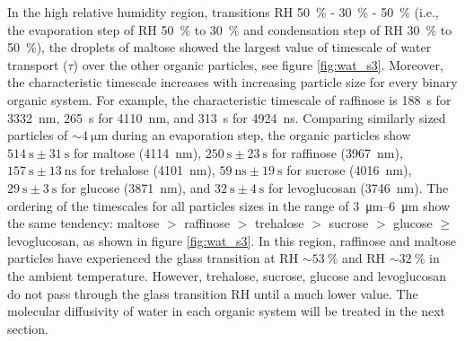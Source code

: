 In the high relative humidity region, transitions RH \SI{50}{\percent} - \SI{30}{\percent} - \SI{50}{\percent} (i.e., the evaporation step of RH \SI{50}{\percent} to \SI{30}{\percent} and condensation step of RH \SI{30}{\percent} to \SI{50}{\percent}), the droplets of maltose showed the largest value of timescale of water transport ($\tau$) over the other organic particles, see figure \ref{fig:wat_s3}. Moreover, the characteristic timescale increases with increasing particle size for every binary organic system. For example, the characteristic timescale of raffinose is \SI{188}{\second} for \SI{3332}{\nano\meter}, \SI{265}{\second} for \SI{4110}{\nano\meter}, and \SI{313}{\second} for \SI{4924}{\nano\second}. Comparing similarly sized particles of $\sim \SI{4}{\micro\meter}$ during an evaporation step, the organic particles show $\SI{514}{\second} \pm \SI{31}{\second}$ for maltose (\SI{4114}{\nano\meter}), $\SI{250}{\second} \pm \SI{23}{\second}$ for raffinose (\SI{3967}{\nano\meter}), $\SI{157}{\second} \pm \SI{13}{\nano\second}$ for trehalose (\SI{4101}{\nano\meter}), $\SI{59}{\nano\second} \pm \SI{19}{\second}$ for sucrose (\SI{4016}{\nano\meter}), $\SI{29}{\second} \pm \SI{3}{\second}$ for glucose (\SI{3871}{\nano\meter}), and $\SI{32}{\second} \pm \SI{4}{\second}$ for levoglucosan (\SI{3746}{\nano\meter}). The ordering of the timescales for all particles sizes in the range of \SIrange[range-phrase=--]{3}{6}{\micro\meter} show the same tendency: maltose $>$ raffinose $>$ trehalose $>$ sucrose $>$ glucose $\ge$ levoglucosan, as shown in figure \ref{fig:wat_s3}. In this region, raffinose and maltose particles have experienced the glass transition at RH $\sim \SI{53}{\percent}$ and RH $\sim\SI{32}{\percent}$ in the ambient temperature\cite{Song2016a,Tong2011}. However, trehalose, sucrose, glucose and levoglucosan do not pass through the glass transition RH until a much lower value. The molecular diffusivity of water in each organic system will be treated in the next section.

